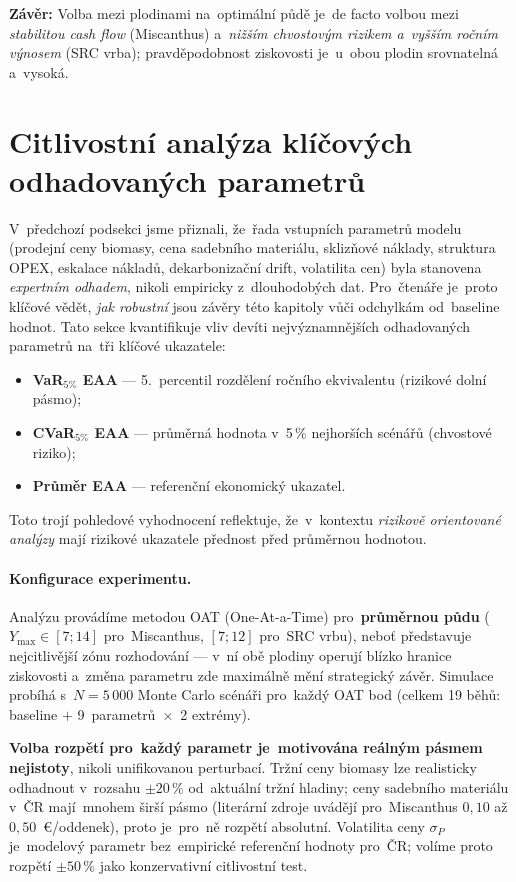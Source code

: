 \textbf{Závěr:} Volba mezi plodinami na~optimální půdě je~de facto
volbou mezi \emph{stabilitou cash flow} (Miscanthus) a~\emph{nižším
chvostovým rizikem a~vyšším ročním výnosem} (SRC vrba); pravděpodobnost
ziskovosti je~u~obou plodin srovnatelná a~vysoká.

\section{Citlivostní analýza klíčových odhadovaných parametrů}
\label{sec:vysledky-citlivost}

V~předchozí podsekci jsme přiznali, že~řada vstupních parametrů modelu
(prodejní ceny biomasy, cena sadebního materiálu, sklizňové náklady,
struktura OPEX, eskalace nákladů, dekarbonizační drift, volatilita
cen) byla stanovena \emph{expertním odhadem}, nikoli empiricky
z~dlouhodobých dat. Pro~čtenáře je~proto klíčové vědět, \emph{jak
robustní} jsou závěry této kapitoly vůči odchylkám od~baseline hodnot.
Tato sekce kvantifikuje vliv devíti nejvýznamnějších odhadovaných
parametrů na~tři klíčové ukazatele:
\begin{itemize}
    \item \textbf{VaR$_{5\%}$ EAA} --- 5.~percentil rozdělení ročního
          ekvivalentu (rizikové dolní pásmo);
    \item \textbf{CVaR$_{5\%}$ EAA} --- průměrná hodnota v~5\,\% nejhorších
          scénářů (chvostové riziko);
    \item \textbf{Průměr EAA} --- referenční ekonomický ukazatel.
\end{itemize}
Toto trojí pohledové vyhodnocení reflektuje, že~v~kontextu
\emph{rizikově orientované analýzy} mají rizikové ukazatele přednost
před průměrnou hodnotou.

\paragraph{Konfigurace experimentu.}
Analýzu provádíme metodou OAT (One-At-a-Time) pro~\textbf{průměrnou
půdu} ($Y_{\max} \in [7;14]$ pro~Miscanthus, $[7;12]$ pro~SRC vrbu),
neboť představuje nejcitlivější zónu rozhodování --- v~ní obě plodiny
operují blízko hranice ziskovosti a~změna parametru zde maximálně
mění strategický závěr. Simulace probíhá s~$N = 5\,000$ Monte Carlo
scénáři pro~každý OAT bod (celkem 19 běhů: baseline $+$ 9~parametrů~$\times$~2
extrémy).

\textbf{Volba rozpětí pro~každý parametr je~motivována reálným pásmem
nejistoty}, nikoli unifikovanou perturbací. Tržní ceny biomasy lze
realisticky odhadnout v~rozsahu $\pm 20\,\%$ od~aktuální tržní hladiny;
ceny sadebního materiálu v~ČR mají~mnohem širší pásmo (literární
zdroje uvádějí pro~Miscanthus $0{,}10$ až $0{,}50$~€/oddenek), proto
je~pro~ně rozpětí absolutní. Volatilita ceny $\sigma_P$ je~modelový
parametr bez~empirické referenční hodnoty pro~ČR; volíme proto rozpětí
$\pm 50\,\%$ jako konzervativní citlivostní test.

